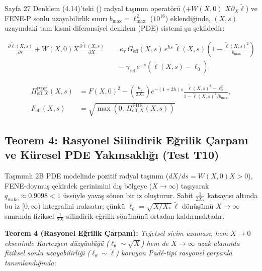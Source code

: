 \documentclass[12pt,a4paper]{article}
\begin{document}
Sayfa 27 Denklem (4.14)'teki () radyal taşınım operatörü ($+W(X, 0)$ $X \partial_X \tilde{\ell}$) ve FENE-P sonlu uzayabilirlik sınırı $b_{\max} = \ell_{\max}^2$ ($10^{16}$) eklendiğinde, $(X, s)$ uzayındaki tam kısmi diferansiyel denklem (PDE) sistemi şu şekildedir:

\begin{equation}
\begin{split}
\frac{\partial \tilde{\ell}(X, s)}{\partial s} + W(X, 0) X \frac{\partial \tilde{\ell}(X, s)}{\partial X} &= \kappa_r \, G_{\mathrm{eff}}(X, s) \, e^{h s} \, \tilde{\ell}(X, s) \left( 1 - \frac{\tilde{\ell}(X, s)^2}{b_{\max}} \right) \\
&\quad - \gamma_{\mathrm{rel}} \, e^{-s} \left( \tilde{\ell}(X, s) - \ell_0 \right)
\end{split}
\end{equation}

\begin{equation}
\begin{split}
\Pi_{\mathrm{eff}, X}^{\mathrm{PDE}}(X, s) &= F(X, 0)^2 - \left( \frac{\mu_s}{2 X_*} \right) e^{-(1+2h)s} \frac{\tilde{\ell}(X, s)^2 - \ell_0^2}{1 - \tilde{\ell}(X, s)^2 / b_{\max}}, \\
F_{\mathrm{eff}}(X, s) &= \sqrt{\max\left( 0, \, \Pi_{\mathrm{eff}, X}^{\mathrm{PDE}}(X, s) \right)}
\end{split}
\end{equation}

\subsection{Teorem 4: Rasyonel Silindirik Eğrilik Çarpanı ve Küresel PDE Yakınsaklığı (Test T10)}

Taşınımlı 2B PDE modelinde pozitif radyal taşınım ($dX/ds = W(X,0)X > 0$), FENE-doymuş çekirdek gerinimini dış bölgeye ($X \to \infty$) taşıyarak $q_{\mathrm{wake}} \approx 0.9098 < 1$ üssüyle yavaş sönen bir iz oluşturur. Sabit $\frac{1}{2X_*}$ katsayısı altında bu iz $[0,\infty)$ integralini ıraksatır; çünkü $\ell_\theta = \sqrt{X/X_*}\,\tilde{\ell}$ dönüşümü $X \to \infty$ sınırında fiziksel $\frac{1}{2X}$ silindirik eğrilik sönümünü ortadan kaldırmaktadır.

\textbf{Teorem 4 (Rasyonel Eğrilik Çarpanı):} \textit{Teğetsel sicim uzaması, hem $X \to 0$ ekseninde Kartezyen düzgünlüğü ($\ell_\theta \sim \sqrt{X}$) hem de $X \to \infty$ uzak alanında fiziksel sonlu uzayabilirliği ($\ell_\theta \sim \tilde{\ell}$) koruyan Padé-tipi rasyonel çarpanla tanımlandığında:}
\end{document}
